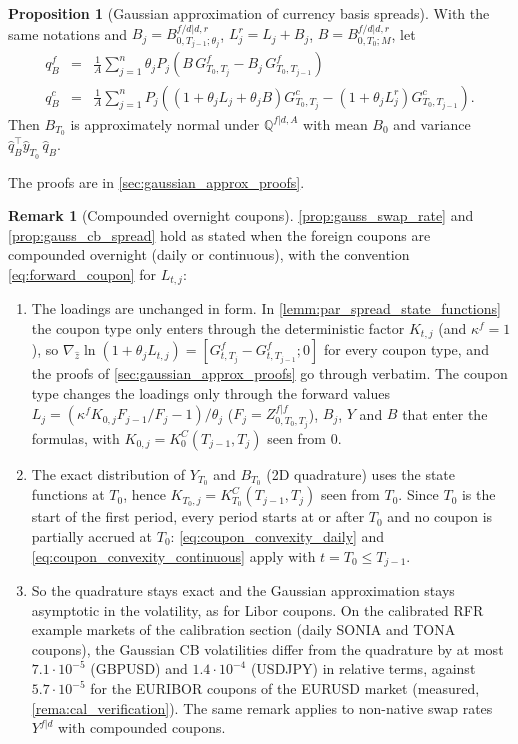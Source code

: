 \documentclass[11pt,english]{amsart}
\newcommand{\QQ}{\mathbb{Q}}
\theoremstyle{definition}
\newtheorem{prop}{Proposition}
\newtheorem{rema}{Remark}
\begin{document}
\begin{prop}[Gaussian approximation of currency basis spreads]\label{prop:gauss_cb_spread}
With the same notations and $B_j = B^{f/d|d,r}_{0,T_{j-1};\theta_j}$, $L^r_j = L_j + B_j$, $B = B^{f/d|d,r}_{0,T_0;M}$, let
\begin{eqnarray}
  q^{f}_B &=& \frac{1}{A} \sum_{j=1}^n \theta_j P_j\left( B\, G^f_{T_0,T_j} - B_j\, G^f_{T_0,T_{j-1}} \right) \\
  q^{c}_B &=& \frac{1}{A} \sum_{j=1}^n P_j\left( (1+\theta_j L_j + \theta_j B) G^c_{T_0,T_j} - (1+\theta_j L^r_j) G^c_{T_0,T_{j-1}} \right) .
\end{eqnarray}
Then $B_{T_0}$ is approximately normal under $\QQ^{f|d,A}$ with mean $B_0$ and variance $\hat{q}_B^\top \hat{y}_{T_0}\, \hat{q}_B$.
\end{prop}

The proofs are in \autoref{sec:gaussian_approx_proofs}.

\begin{rema}[Compounded overnight coupons]\label{rema:gauss_compounded}
\autoref{prop:gauss_swap_rate} and \autoref{prop:gauss_cb_spread} hold as stated when the foreign coupons are compounded overnight (daily or continuous), with the convention \eqref{eq:forward_coupon} for $L_{t,j}$:
\begin{enumerate}
\item The loadings are unchanged in form. In \autoref{lemm:par_spread_state_functions} the coupon type only enters through the deterministic factor $K_{t,j}$ (and $\kappa^f = 1$), so $\nabla_{\hat{z}}\ln(1+\theta_jL_{t,j}) = [G^f_{t,T_j}-G^f_{t,T_{j-1}};0]$ for every coupon type, and the proofs of \autoref{sec:gaussian_approx_proofs} go through verbatim. The coupon type changes the loadings only through the forward values $L_j = (\kappa^fK_{0,j}F_{j-1}/F_j - 1)/\theta_j$ ($F_j = Z^{f|f}_{0,T_0,T_j}$), $B_j$, $Y$ and $B$ that enter the formulas, with $K_{0,j} = K^C_0(T_{j-1},T_j)$ seen from $0$.
\item The exact distribution of $Y_{T_0}$ and $B_{T_0}$ (2D quadrature) uses the state functions at $T_0$, hence $K_{T_0,j} = K^C_{T_0}(T_{j-1},T_j)$ seen from $T_0$. Since $T_0$ is the start of the first period, every period starts at or after $T_0$ and no coupon is partially accrued at $T_0$: \eqref{eq:coupon_convexity_daily} and \eqref{eq:coupon_convexity_continuous} apply with $t = T_0\le T_{j-1}$.
\item So the quadrature stays exact and the Gaussian approximation stays asymptotic in the volatility, as for Libor coupons. On the calibrated RFR example markets of the calibration section (daily SONIA and TONA coupons), the Gaussian CB volatilities differ from the quadrature by at most $7.1\cdot10^{-5}$ (GBPUSD) and $1.4\cdot10^{-4}$ (USDJPY) in relative terms, against $5.7\cdot10^{-5}$ for the EURIBOR coupons of the EURUSD market (measured, \autoref{rema:cal_verification}). The same remark applies to non-native swap rates $Y^{f|d}$ with compounded coupons.
\end{enumerate}
\end{rema}
\end{document}
